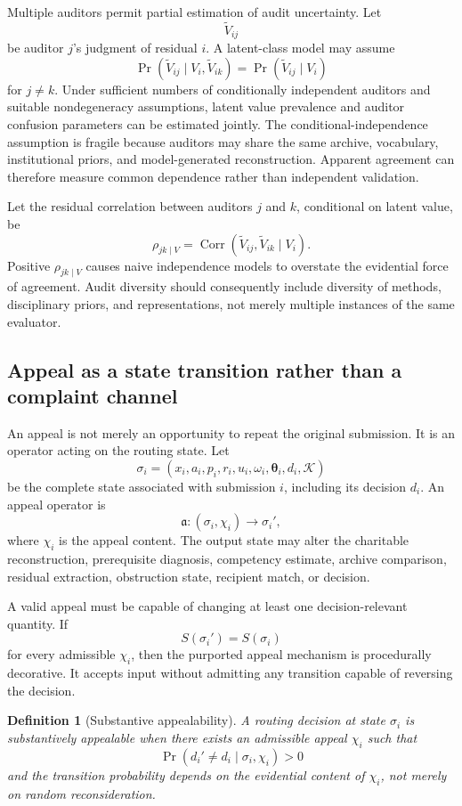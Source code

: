 \documentclass[11pt]{article}
\newtheorem{definition}{Definition}[section]
\theoremstyle{definition}
\DeclareMathOperator{\Prob}{Pr}
\DeclareMathOperator{\Corr}{Corr}
\newcommand{\K}{\mathcal{K}}
\newcommand{\thetaState}{\boldsymbol{\theta}}
\begin{document}
Multiple auditors permit partial estimation of audit uncertainty. Let
\[
\widetilde V_{ij}
\]
be auditor \(j\)'s judgment of residual \(i\). A latent-class model may assume
\[
\Prob(\widetilde V_{ij}\mid V_i,\widetilde V_{ik})
=
\Prob(\widetilde V_{ij}\mid V_i)
\]
for \(j\neq k\). Under sufficient numbers of conditionally independent auditors and suitable nondegeneracy assumptions, latent value prevalence and auditor confusion parameters can be estimated jointly. The conditional-independence assumption is fragile because auditors may share the same archive, vocabulary, institutional priors, and model-generated reconstruction. Apparent agreement can therefore measure common dependence rather than independent validation.

Let the residual correlation between auditors \(j\) and \(k\), conditional on latent value, be
\[
\rho_{jk\mid V}
=
\Corr(
\widetilde V_{ij},
\widetilde V_{ik}
\mid
V_i
).
\]
Positive \(\rho_{jk\mid V}\) causes naive independence models to overstate the evidential force of agreement. Audit diversity should consequently include diversity of methods, disciplinary priors, and representations, not merely multiple instances of the same evaluator.

\subsection{Appeal as a state transition rather than a complaint channel}

An appeal is not merely an opportunity to repeat the original submission. It is an operator acting on the routing state. Let
\[
\sigma_i
=
\left(
x_i,
a_i,
p_i,
r_i,
u_i,
\omega_i,
\thetaState_i,
d_i,
\K
\right)
\]
be the complete state associated with submission \(i\), including its decision \(d_i\). An appeal operator is
\[
\mathfrak{a}:
(\sigma_i,\chi_i)
\longrightarrow
\sigma_i',
\]
where \(\chi_i\) is the appeal content. The output state may alter the charitable reconstruction, prerequisite diagnosis, competency estimate, archive comparison, residual extraction, obstruction state, recipient match, or decision.

A valid appeal must be capable of changing at least one decision-relevant quantity. If
\[
S(\sigma_i')=S(\sigma_i)
\]
for every admissible \(\chi_i\), then the purported appeal mechanism is procedurally decorative. It accepts input without admitting any transition capable of reversing the decision.

\begin{definition}[Substantive appealability]
A routing decision at state \(\sigma_i\) is substantively appealable when there exists an admissible appeal \(\chi_i\) such that
\[
\Prob\!\left(
d_i'\neq d_i
\mid
\sigma_i,\chi_i
\right)>0
\]
and the transition probability depends on the evidential content of \(\chi_i\), not merely on random reconsideration.
\end{definition}
\end{document}
